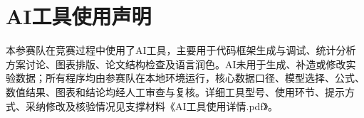 \documentclass[withoutpreface]{cumcmthesis}
\begin{document}
\section*{AI工具使用声明}
本参赛队在竞赛过程中使用了AI工具，主要用于代码框架生成与调试、统计分析方案讨论、图表排版、论文结构检查及语言润色。AI未用于生成、补造或修改实验数据；所有程序均由参赛队在本地环境运行，核心数据口径、模型选择、公式、数值结果、图表和结论均经人工审查与复核。详细工具型号、使用环节、提示方式、采纳修改及核验情况见支撑材料《AI工具使用详情.pdf》。

\begingroup
\small


\endgroup



\clearpage
\appendix
\end{document}
